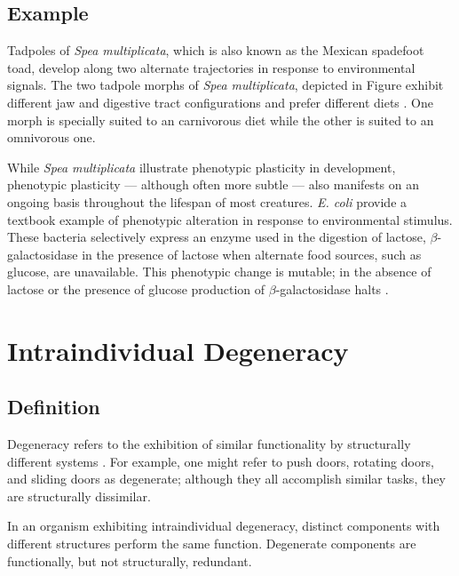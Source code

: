 \subsection{Example}

Tadpoles of \textit{Spea multiplicata}, which is also known as the Mexican spadefoot toad, develop along two alternate trajectories in response to environmental signals. The two tadpole morphs of \textit{Spea multiplicata}, depicted in Figure  exhibit different jaw and digestive tract configurations and prefer different diets \cite{Fusco2010PhenotypicConcepts}. One morph is specially suited to an carnivorous diet while the other is suited to an omnivorous one\cite{Pfennig1992PolyphenismStrategy}.

While \textit{Spea multiplicata} illustrate phenotypic plasticity in development, phenotypic plasticity --- although often more subtle --- also manifests on an ongoing basis throughout the lifespan of most creatures. \textit{E. coli} provide a textbook example of phenotypic alteration in response to environmental stimulus. These bacteria selectively express an enzyme used in the digestion of lactose, $\beta$-galactosidase in the presence of lactose when alternate food sources, such as glucose, are unavailable. This phenotypic change is mutable; in the absence of lactose or the presence of glucose production of $\beta$-galactosidase halts \cite{Griffiths2015IntroductionAnalysis}.


\section{Intraindividual Degeneracy} \label{sec:intraindividual_degeneracy}

\subsection{Definition}

Degeneracy refers to the exhibition of similar functionality by structurally different systems \cite{Edelman2001DegeneracySystems}. For example, one might refer to push doors, rotating doors, and sliding doors as degenerate; although they all accomplish similar tasks, they are structurally dissimilar.

In an organism exhibiting intraindividual degeneracy, distinct components with different structures perform the same function. Degenerate components are functionally, but not structurally, redundant.

